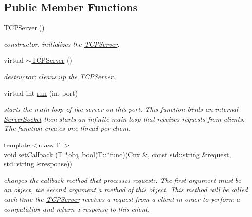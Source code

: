 \subsection*{Public Member Functions}
\begin{DoxyCompactItemize}
\item 
\hyperlink{class_t_c_p_server_a3a5e3cfe42c676ed71f2bc58dcc92bda}{T\+C\+P\+Server} ()\hypertarget{class_t_c_p_server_a3a5e3cfe42c676ed71f2bc58dcc92bda}{}\label{class_t_c_p_server_a3a5e3cfe42c676ed71f2bc58dcc92bda}

\begin{DoxyCompactList}\small\item\em constructor\+: initializes the \hyperlink{class_t_c_p_server}{T\+C\+P\+Server}. \end{DoxyCompactList}\item 
virtual \hyperlink{class_t_c_p_server_abc497ac52355e53986a6a1bd1acb9581}{$\sim$\+T\+C\+P\+Server} ()\hypertarget{class_t_c_p_server_abc497ac52355e53986a6a1bd1acb9581}{}\label{class_t_c_p_server_abc497ac52355e53986a6a1bd1acb9581}

\begin{DoxyCompactList}\small\item\em destructor\+: cleans up the \hyperlink{class_t_c_p_server}{T\+C\+P\+Server}. \end{DoxyCompactList}\item 
virtual int \hyperlink{class_t_c_p_server_a1409041961e91f1dbc4933483b4c3b23}{run} (int port)
\begin{DoxyCompactList}\small\item\em starts the main loop of the server on this port. This function binds an internal \hyperlink{class_server_socket}{Server\+Socket} then starts an infinite main loop that receives requests from clients. The function creates one thread per client. \end{DoxyCompactList}\item 
{\footnotesize template$<$class T $>$ }\\void \hyperlink{class_t_c_p_server_ac62c8c7a1d1137b74e2a1fa6d8a4a876}{set\+Callback} (T $\ast$obj, bool(T\+::$\ast$func)(\hyperlink{class_t_c_p_server_1_1_cnx}{Cnx} \&, const std\+::string \&request, std\+::string \&response))
\begin{DoxyCompactList}\small\item\em changes the callback method that processes requests. The first argument must be an object, the second argument a method of this object. This method will be called each time the \hyperlink{class_t_c_p_server}{T\+C\+P\+Server} receives a \textquotesingle{}request\textquotesingle{} from a client in order to perform a computation and return a \textquotesingle{}response\textquotesingle{} to this client. \end{DoxyCompactList}\end{DoxyCompactItemize}
